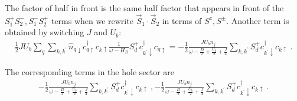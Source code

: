 The factor of half in front is the same half factor that appears in front of the \(S_1^+ S_2^-, S_1^-S_2^+\) terms when we rewrite \(\vec{S}_1\cdot\vec{S}_2\) in terms of \(S^z, S^\pm\). Another term is obtained by switching \(J\) and \(U_b\):
\begin{eqnarray}
	\frac{1}{2} J U_b \sum_{q} \sum_{k,k^\prime} \hat n_{q \downarrow} c^\dagger_{q \uparrow} c_{k \uparrow} \frac{1}{\omega - H_D}S_d^+ c^\dagger_{k^\prime \downarrow} c_{q \uparrow} = -\frac{1}{2}\frac{J U_b n_j}{\omega - \frac{D}{2} + \frac{U_b}{2} + \frac{J}{4}} \sum_{k,k^\prime} S_d^+ c^\dagger_{k^\prime \downarrow} c_{k \uparrow}~.
\end{eqnarray}

The corresponding terms in the hole sector are
\begin{eqnarray}
	-\frac{1}{2}\frac{J U_b n_j}{\omega - \frac{D}{2} + \frac{U_b}{2} + \frac{J}{4}} \sum_{k,k^\prime} S_d^+ c^\dagger_{k^\prime \downarrow} c_{k \uparrow}~, -\frac{1}{2}\frac{J U_b n_j}{\omega - \frac{D}{2} + \frac{U_b}{2} + \frac{J}{4}} \sum_{k,k^\prime} S_d^+ c^\dagger_{k^\prime \downarrow} c_{k \uparrow}~.
\end{eqnarray}

